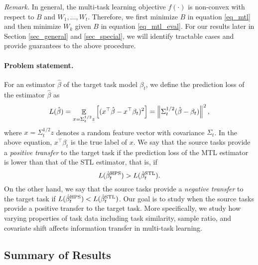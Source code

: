 \smallskip
\noindent\textit{Remark.}
In general, the multi-task learning objective $f(\cdot)$ is non-convex with respect to $B$ and $W_1, \dots, W_t$.
Therefore, we first minimize $B$ in equation \eqref{eq_mtl} and then minimize $W_k$ given $B$ in equation \eqref{eq_mtl_eval}.
For our results later in Section \ref{sec_general} and \ref{sec_special}, we will identify tractable cases and provide guarantees to the above procedure.

\paragraph{Problem statement.}
For an estimator $\hat{\beta}$ of the target task model $\beta_t$, we define the prediction loss of the estimator $\hat{\beta}$ as
	{\begin{align}\label{eq1_prediction_loss}
		L(\hat{\beta}) = \mathop{\mathbb{E}}_{x = \Sigma_t^{1/2} z}\left[ ({x}^{\top}\hat{\beta} - {x}^{\top}\beta_t)^2 \right]
		= \left\| \Sigma_t^{1/2} (\hat{\beta} - \beta_t) \right\|^2,
	\end{align}}%
where $x = \Sigma_t^{1/2} z$ denotes a random feature vector with covariance $\Sigma_t$.
In the above equation, $x^{\top}\beta_t$ is the true label of $x$.
We say that the source tasks provide a \textit{positive transfer} to the target task if the prediction loss of the MTL estimator is lower than that of the STL estimator, that is, if
	\[ L(\hat{\beta}_t^{\textup{HPS}}) > L(\hat{\beta}_t^{\textup{STL}}). \]
On the other hand, we say that the source tasks provide a \textit{negative transfer} to the target task if $L(\hat{\beta}_t^{\textup{HPS}}) < L(\hat{\beta}_t^{\textup{STL}})$.
Our goal is to study when the source tasks provide a positive transfer to the target task.
More specifically, we study how varying properties of task data including task similarity, sample ratio, and covariate shift affects information transfer in multi-task learning.



\subsection{Summary of Results}



